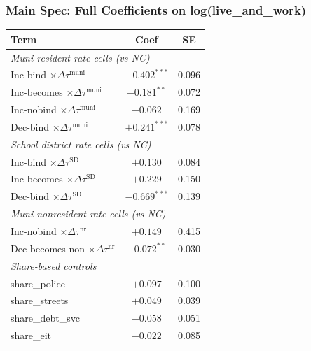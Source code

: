 \documentclass[xcolor = x11names, compress, aspectratio = 169]{beamer}
\begin{document}
    \begin{frame}
    \frametitle{Main Spec: Full Coefficients on log(live\_and\_work)}
        \centering
        \scriptsize
        \renewcommand{\arraystretch}{1.05}
        \setlength{\tabcolsep}{6pt}
        \begin{tabular}{lcc}
            \toprule
            Term & Coef & SE \\
            \midrule
            \multicolumn{3}{l}{\textit{Muni resident-rate cells (vs NC)}} \\
            Inc-bind $\times \Delta\tau^{\text{muni}}$       & $\bm{-0.402^{***}}$ & 0.096 \\
            Inc-becomes $\times \Delta\tau^{\text{muni}}$    & $\bm{-0.181^{**}}$  & 0.072 \\
            Inc-nobind $\times \Delta\tau^{\text{muni}}$     & $-0.062$            & 0.169 \\
            Dec-bind $\times \Delta\tau^{\text{muni}}$       & $+0.241^{***}$      & 0.078 \\
            \multicolumn{3}{l}{\textit{School district rate cells (vs NC)}} \\
            Inc-bind $\times \Delta\tau^{\text{SD}}$         & $+0.130$            & 0.084 \\
            Inc-becomes $\times \Delta\tau^{\text{SD}}$      & $+0.229$            & 0.150 \\
            Dec-bind $\times \Delta\tau^{\text{SD}}$         & $-0.669^{***}$      & 0.139 \\
            \multicolumn{3}{l}{\textit{Muni nonresident-rate cells (vs NC)}} \\
            Inc-nobind $\times \Delta\tau^{\text{nr}}$       & $+0.149$            & 0.415 \\
            Dec-becomes-non $\times \Delta\tau^{\text{nr}}$  & $-0.072^{**}$       & 0.030 \\
            \multicolumn{3}{l}{\textit{Share-based controls}} \\
            share\_police                                     & $+0.097$            & 0.100 \\
            share\_streets                                    & $+0.049$            & 0.039 \\
            share\_debt\_svc                                  & $-0.058$            & 0.051 \\
            share\_eit                                        & $-0.022$            & 0.085 \\

\end{tabular}
\end{frame}
\end{document}
